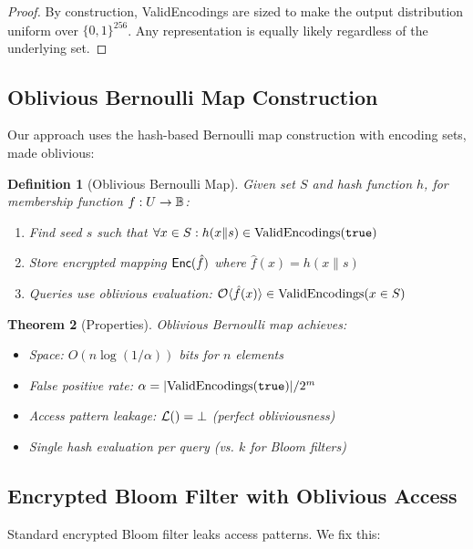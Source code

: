 \documentclass[11pt,final,hidelinks]{article}
\newcommand{\fprate}{\alpha}
\newtheorem{theorem}{Theorem}[section]
\newtheorem{definition}[theorem]{Definition}
\begin{document}
\begin{proof}
By construction, ValidEncodings are sized to make the output distribution uniform over $\{0,1\}^{256}$. Any representation is equally likely regardless of the underlying set.
\end{proof}

\subsection{Oblivious Bernoulli Map Construction}

Our approach uses the hash-based Bernoulli map construction with encoding sets, made oblivious:

\begin{definition}[Oblivious Bernoulli Map]
Given set $S$ and hash function $h$, for membership function $f: U \to \mathbb{B}$:
\begin{enumerate}
    \item Find seed $s$ such that $\forall x \in S: h(x \| s) \in \text{ValidEncodings}(\mathtt{true})$
    \item Store encrypted mapping $\mathsf{Enc}(\hat{f})$ where $\hat{f}(x) = h(x \| s)$
    \item Queries use oblivious evaluation: $\mathcal{O}\langle \hat{f}(x) \rangle \in \text{ValidEncodings}(x \in S)$
\end{enumerate}
\end{definition}

\begin{theorem}[Properties]
Oblivious Bernoulli map achieves:
\begin{itemize}
    \item Space: $O(n \log(1/\fprate))$ bits for $n$ elements
    \item False positive rate: $\fprate = |\text{ValidEncodings}(\True)|/2^m$ 
    \item Access pattern leakage: $\mathcal{L}() = \bot$ (perfect obliviousness)
    \item Single hash evaluation per query (vs. $k$ for Bloom filters)
\end{itemize}
\end{theorem}

\subsection{Encrypted Bloom Filter with Oblivious Access}

Standard encrypted Bloom filter leaks access patterns. We fix this:
\end{document}
